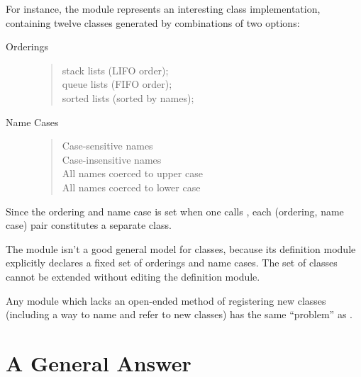 For instance, the module  represents an interesting class
implementation, containing twelve classes generated by combinations of two options:
\begin{description}
 \item[Orderings]\indent\par
  \begin{quote}
   stack lists  (LIFO order); \\
   queue lists  (FIFO order); \\
   sorted lists (sorted by names);
  \end{quote}
 \item[Name Cases]\indent\par
  \begin{quote}
   Case-sensitive names    \\
   Case-insensitive names  \\
   All names coerced to upper case \\
   All names coerced to lower case
  \end{quote}
\end{description}

Since the ordering and name case is set when one calls , each
(ordering, name case) pair constitutes a separate  class.

The  module isn't a good general model for classes, because
its definition module explicitly declares a fixed set of orderings and name
cases.  The  set of classes cannot be extended without editing
the  definition module.

Any module which lacks an open-ended method of registering new classes (including a
way to name and refer to new classes) has the same ``problem'' as
.

\section{A General Answer}

